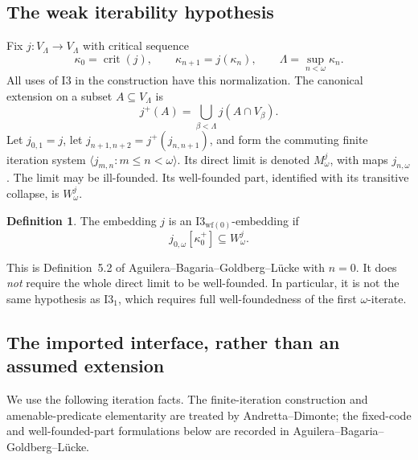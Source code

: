 \documentclass[11pt,letterpaper]{article}
\theoremstyle{definition}
\newtheorem{definition}{Definition}[section]
\newcommand{\crit}{\operatorname{crit}}
\newcommand{\Ithree}{\mathrm{I3}}
\newcommand{\Iwf}{\mathrm{I3}_{\mathrm{wf}(0)}}
\newcommand{\Iwfone}{\mathrm{I3}_{1}}
\newcommand{\seq}[1]{\langle #1\rangle}
\begin{document}
\subsection{The weak iterability hypothesis}

Fix $j:V_\Lambda\to V_\Lambda$ with critical sequence
\[
 \kappa_0=\crit(j),\qquad \kappa_{n+1}=j(\kappa_n),\qquad
 \Lambda=\sup_{n<\omega}\kappa_n.
\]
All uses of $\Ithree$ in the construction have this normalization. The
canonical extension on a subset $A\subseteq V_\Lambda$ is
\[
 j^+(A)=\bigcup_{\beta<\Lambda}j(A\cap V_\beta).
\]
Let $j_{0,1}=j$, let
$j_{n+1,n+2}=j^+(j_{n,n+1})$, and form the commuting finite iteration
system $\seq{j_{m,n}:m\leq n<\omega}$. Its direct limit is denoted
$M^j_\omega$, with maps $j_{n,\omega}$. The limit may be ill-founded.
Its well-founded part, identified with its transitive collapse, is
$W^j_\omega$.

\begin{definition}\label{def:wf}
The embedding $j$ is an $\Iwf$-embedding if
\begin{equation}\label{eq:wf}
 j_{0,\omega}[\kappa_0^+]\subseteq W^j_\omega.
\end{equation}
\end{definition}

This is Definition~5.2 of Aguilera--Bagaria--Goldberg--L\"ucke with
$n=0$.\cite{abgl} It does \emph{not} require the whole direct limit to
be well-founded. In particular, it is not the same hypothesis as
$\Iwfone$, which requires full well-foundedness of the first
$\omega$-iterate.

\subsection{The imported interface, rather than an assumed extension}

We use the following iteration facts. The finite-iteration construction
and amenable-predicate elementarity are treated by
Andretta--Dimonte; the fixed-code and well-founded-part formulations below
are recorded in Aguilera--Bagaria--Goldberg--L\"ucke.\cite[Section~3,
 especially Lemma~3.3]{ad}\cite[Proposition~5.1 and proof of Theorem~5.4]{abgl}
\end{document}
